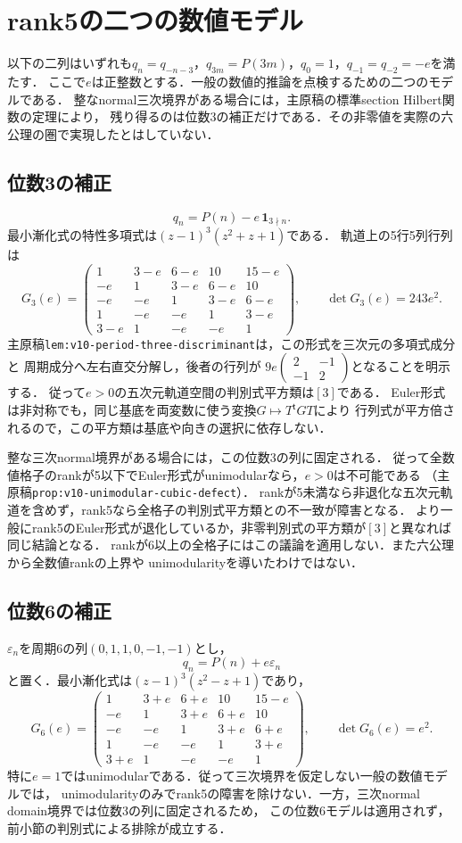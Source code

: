 \documentclass[11pt,a4paper]{ltjsarticle}
\begin{document}
\section{rank5の二つの数値モデル}
以下の二列はいずれも$q_n=q_{-n-3}$，$q_{3m}=P(3m)$，$q_0=1$，$q_{-1}=q_{-2}=-e$を満たす．
ここで$e$は正整数とする．一般の数値的推論を点検するための二つのモデルである．
整なnormal三次境界がある場合には，主原稿の標準section Hilbert関数の定理により，
残り得るのは位数$3$の補正だけである．その非零値を実際の六公理の圏で実現したとはしていない．

\subsection{位数3の補正}
\[
 q_n=P(n)-e\,\mathbf1_{3\nmid n}.
\]
最小漸化式の特性多項式は$(z-1)^3(z^2+z+1)$である．
軌道上の5行5列行列は
\[
 G_3(e)=\begin{pmatrix}
 1&3-e&6-e&10&15-e\\
 -e&1&3-e&6-e&10\\
 -e&-e&1&3-e&6-e\\
 1&-e&-e&1&3-e\\
 3-e&1&-e&-e&1
 \end{pmatrix},\qquad \det G_3(e)=243e^2.
\]
主原稿\texttt{lem:v10-period-three-discriminant}は，この形式を三次元の多項式成分と
周期成分へ左右直交分解し，後者の行列が
$9e\left(\begin{smallmatrix}2&-1\\-1&2\end{smallmatrix}\right)$となることを明示する．
従って$e>0$の五次元軌道空間の判別式平方類は$[3]$である．
Euler形式は非対称でも，同じ基底を両変数に使う変換$G\mapsto T^{\mathsf t}GT$により
行列式が平方倍されるので，この平方類は基底や向きの選択に依存しない．

整な三次normal境界がある場合には，この位数3の列に固定される．
従って全数値格子のrankが5以下でEuler形式がunimodularなら，$e>0$は不可能である
（主原稿\texttt{prop:v10-unimodular-cubic-defect}）．
rankが5未満なら非退化な五次元軌道を含めず，rank5なら全格子の判別式平方類との不一致が障害となる．
より一般にrank5のEuler形式が退化しているか，非零判別式の平方類が$[3]$と異なれば同じ結論となる．
rankが6以上の全格子にはこの議論を適用しない．また六公理から全数値rankの上界や
unimodularityを導いたわけではない．

\subsection{位数6の補正}
$\varepsilon_n$を周期6の列$(0,1,1,0,-1,-1)$とし，
\[
 q_n=P(n)+e\varepsilon_n
\]
と置く．最小漸化式は$(z-1)^3(z^2-z+1)$であり，
\[
 G_6(e)=\begin{pmatrix}
 1&3+e&6+e&10&15-e\\
 -e&1&3+e&6+e&10\\
 -e&-e&1&3+e&6+e\\
 1&-e&-e&1&3+e\\
 3+e&1&-e&-e&1
 \end{pmatrix},\qquad \det G_6(e)=e^2.
\]
特に$e=1$ではunimodularである．従って三次境界を仮定しない一般の数値モデルでは，
unimodularityのみでrank5の障害を除けない．一方，三次normal domain境界では位数3の列に固定されるため，
この位数6モデルは適用されず，前小節の判別式による排除が成立する．
\end{document}
